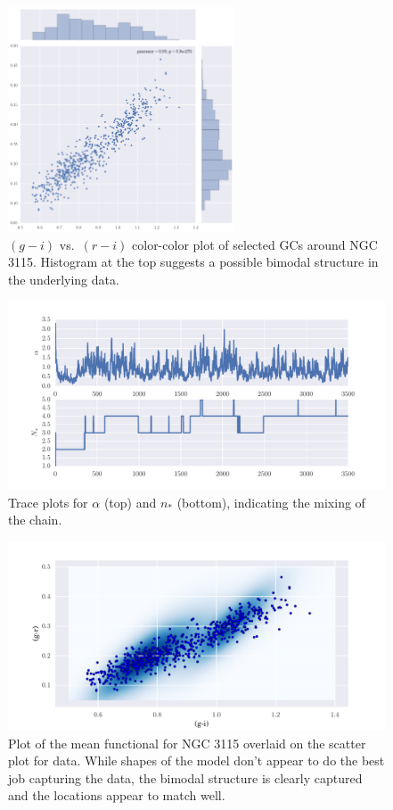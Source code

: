 \documentclass{article}
\begin{document}
\begin{figure}
\centering
\includegraphics[width=0.6\textwidth]{n3115_data.pdf}
\caption{$(g-i)$ vs.~$(r-i)$ color-color plot of selected GCs around NGC 3115. Histogram at the top suggests a possible bimodal
structure in the underlying data.}
\label{n3115_data}
\end{figure}

\begin{figure}
\centering
\includegraphics[width=\textwidth]{n3115_traces.pdf}
\caption{Trace plots for $\alpha$ (top) and $n_*$ (bottom), indicating the mixing of the chain.}
\label{n3115_trace}
\end{figure}

\begin{figure}
\centering
\includegraphics[width=\textwidth]{n3115_data_fit.pdf}
\caption{Plot of the mean functional for NGC 3115 overlaid on the scatter plot for data. While shapes of the model
don't appear to do the best job capturing the data, the bimodal structure is clearly captured and the locations
appear to match well.}
\label{n3115_functional}
\end{figure}
\end{document}
